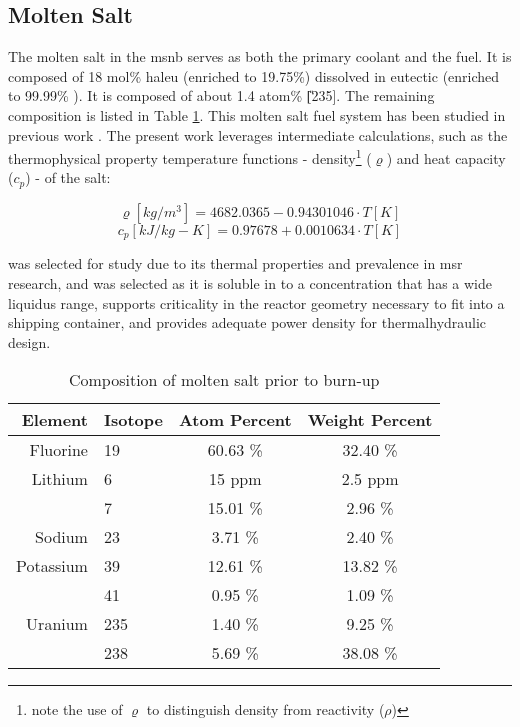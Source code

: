 \subsection{Molten Salt}
The molten salt in the \acs{msnb} serves as both the primary coolant and the fuel. It is composed of 18 mol\% \acs{haleu} \UF \; (enriched to 19.75\%) dissolved in eutectic \flinak (enriched to 99.99\% \Li[7]). It is composed of about 1.4 atom\% \U[235]. The remaining composition is listed in Table \ref{tab:saltcomp}. This molten salt fuel system has been studied in previous work \cite{CarterPHD}. The present work leverages intermediate calculations, such as the thermophysical property temperature functions - density\footnote{note the use of $\varrho$ to distinguish density from reactivity ($\rho$)} ($\varrho$) and heat capacity ($c_p$) - of the salt:

\begin{equation}\label{eq:saltdens}
    \varrho[kg/m^3] = 4682.0365 - 0.94301046\cdot T[K] 
\end{equation}
\begin{equation}\label{eq:saltcp}
    c_p[kJ/kg-K] = 0.97678 + 0.0010634\cdot T[K]
\end{equation}

\flinak was selected for study due to its thermal properties and prevalence in \acs{msr} research, and \UF \; was selected as it is soluble in \flinak to a concentration that has a wide liquidus range, supports criticality in the reactor geometry necessary to fit into a shipping container, and provides adequate power density for thermalhydraulic design. 

\begin{table}[ht!]
    \caption[Molten salt composition]{Composition of molten salt prior to burn-up}
    \centering
    \begin{tabular}{rl|cc}
     Element&Isotope&Atom Percent & Weight Percent \\ \hline
     Fluorine  & 19  & 60.63 \%  & 32.40 \% \\  \hline
     Lithium   & 6   & 15 ppm    & 2.5 ppm  \\
               & 7   & 15.01 \%  & 2.96 \%  \\ \hline
     Sodium    & 23  &  3.71 \%  & 2.40 \%  \\ \hline
     Potassium & 39  & 12.61 \%  & 13.82 \% \\
               & 41  & 0.95 \%  & 1.09 \%  \\ \hline
    Uranium    & 235 & 1.40 \%   & 9.25 \%  \\
               & 238 & 5.69 \%   & 38.08 \% \\
    \end{tabular}
    \label{tab:saltcomp}
\end{table}

